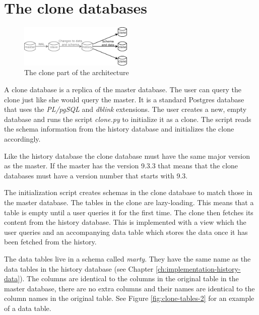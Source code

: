 \section{The clone databases}
\label{ch:impementation-clones}

\begin{figure}
  \vspace{-20pt}
  \begin{center}
    \includegraphics[width=0.48\textwidth]{img/architecture-clones}
  \end{center}
  \vspace{-20pt}
  \caption{The clone part of the architecture}
  \vspace{-10pt}
\end{figure}

A clone database is a replica of the master database.
The user can query the clone just like she would query the master.
It is a standard Postgres database that uses the \textit{PL/pgSQL} and \textit{dblink} extensions.
The user creates a new, empty database and runs the script \textit{clone.py} to initialize it as a clone.
The script reads the schema information from the history database and initializes the clone accordingly.

Like the history database the clone database must have the same major version as the master.
If the master has the version 9.3.3 that means that the clone databases must have a version number that starts with 9.3.

The initialization script creates schemas in the clone database to match those in the master database.
The tables in the clone are lazy-loading.
This means that a table is empty until a user queries it for the first time.
The clone then fetches its content from the history database.
This is implemented with a view which the user queries and an accompanying data table which stores the data once it has been fetched from the history.

The data tables live in a schema called \textit{marty}.
They have the same name as the data tables in the history database (see Chapter \ref{ch:implementation-history-data}).
The columns are identical to the columns in the original table in the master database, there are no extra columns and their names are identical to the column names in the original table.
See Figure \ref{fig:clone-tables-2} for an example of a data table.

